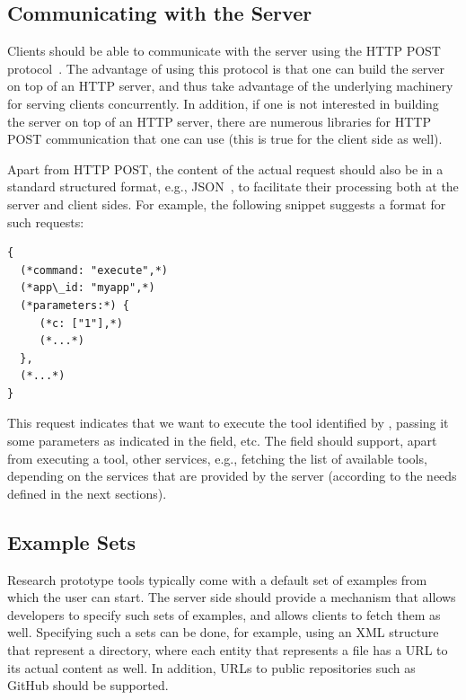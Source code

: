 \subsection{Communicating with the Server}

Clients should be able to communicate with the server using the HTTP
POST protocol~\cite{rfc2616}. The advantage of using this protocol is that
one can build the \ei server on top of an HTTP server, and thus take
advantage of the underlying machinery for serving clients
concurrently.
%
In addition, if one is not interested in building the \ei server on
top of an HTTP server, there are numerous libraries for HTTP POST
communication that one can use (this is true for the client side as
well).

Apart from HTTP POST, the content of the actual request should also be
in a standard structured format, e.g., JSON~\cite{json}, to facilitate
their processing both at the server and client sides. For example, the
following snippet suggests a format for such requests:

\medskip
\begin{lstlisting}
{
  (*command: "execute",*)
  (*app\_id: "myapp",*)
  (*parameters:*) {
     (*c: ["1"],*)
     (*...*)
  },
  (*...*)
}
\end{lstlisting} 

\medskip
\noindent
This request indicates that we want to execute the tool identified by
, passing it some parameters as indicated in the
 field, etc.
%
The  field should support, apart from executing a
tool, other services, e.g., fetching the list of available tools,
depending on the services that are provided by the server (according
to the needs defined in the next sections).

\subsection{Example Sets}

Research prototype tools typically come with a default set of examples
from which the user can start. 
%
The server side should provide a mechanism that allows developers to
specify such sets of examples, and allows clients to fetch them as
well.
%
Specifying such a sets can be done, for example, using an XML
structure that represent a directory, where each entity that
represents a file has a URL to its actual content as well. 
%
In addition, URLs to public repositories such as GitHub should be
supported.


